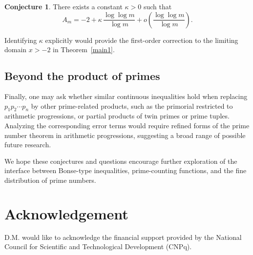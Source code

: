 \documentclass[10pt]{amsart}
\theoremstyle{definition} %
\newtheorem{conjecture}{Conjecture}
\numberwithin{equation}{section}
\begin{document}
\begin{conjecture}
There exists a constant $\kappa>0$ such that
\[
A_m=-2+\kappa\,\frac{\log\log m}{\log m}+o\!\left(\frac{\log\log m}{\log m}\right).
\]
\end{conjecture}

Identifying $\kappa$ explicitly would provide the first-order correction to the limiting
domain $x>-2$ in Theorem~\ref{main1}.

\subsection*{Beyond the product of primes}
Finally, one may ask whether similar continuous inequalities hold when replacing
$p_1p_2\cdots p_n$ by other prime-related products, such as the primorial restricted
to arithmetic progressions, or partial products of twin primes or prime tuples.
Analyzing the corresponding error terms would require refined forms of the
prime number theorem in arithmetic progressions, suggesting a broad range
of possible future research.

\smallskip

We hope these conjectures and questions encourage further exploration of the
interface between Bonse-type inequalities, prime-counting functions, and the
fine distribution of prime numbers.



\section*{Acknowledgement}
D.M. would like to acknowledge the financial support provided by the National Council for Scientific and Technological Development (CNPq).
\end{document}
